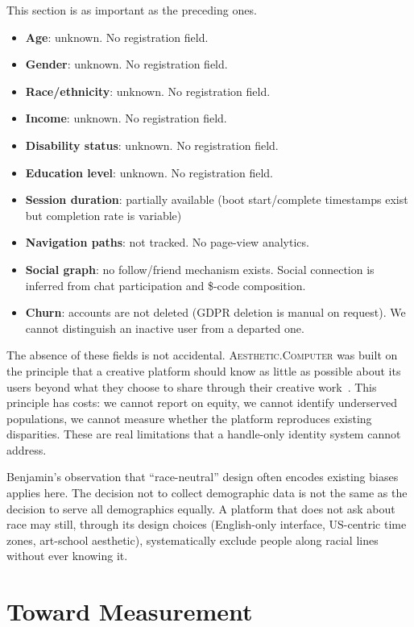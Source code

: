 \documentclass[10pt,letterpaper,twocolumn]{article}
\newcommand{\ac}{\textsc{Aesthetic.Computer}}
\begin{document}
This section is as important as the preceding ones.

\begin{itemize}
  \item \textbf{Age}: unknown. No registration field.
  \item \textbf{Gender}: unknown. No registration field.
  \item \textbf{Race/ethnicity}: unknown. No registration field.
  \item \textbf{Income}: unknown. No registration field.
  \item \textbf{Disability status}: unknown. No registration field.
  \item \textbf{Education level}: unknown. No registration field.
  \item \textbf{Session duration}: partially available (boot start/complete timestamps exist but completion rate is variable)
  \item \textbf{Navigation paths}: not tracked. No page-view analytics.
  \item \textbf{Social graph}: no follow/friend mechanism exists. Social connection is inferred from chat participation and \$-code composition.
  \item \textbf{Churn}: accounts are not deleted (GDPR deletion is manual on request). We cannot distinguish an inactive user from a departed one.
\end{itemize}

The absence of these fields is not accidental. \ac{} was built on the principle that a creative platform should know as little as possible about its users beyond what they choose to share through their creative work~\citep{illich1973tools}. This principle has costs: we cannot report on equity, we cannot identify underserved populations, we cannot measure whether the platform reproduces existing disparities. These are real limitations that a handle-only identity system cannot address.

Benjamin's observation that ``race-neutral'' design often encodes existing biases~\citep{benjamin2019race} applies here. The decision not to collect demographic data is not the same as the decision to serve all demographics equally. A platform that does not ask about race may still, through its design choices (English-only interface, US-centric time zones, art-school aesthetic), systematically exclude people along racial lines without ever knowing it.

\section{Toward Measurement}
\end{document}
